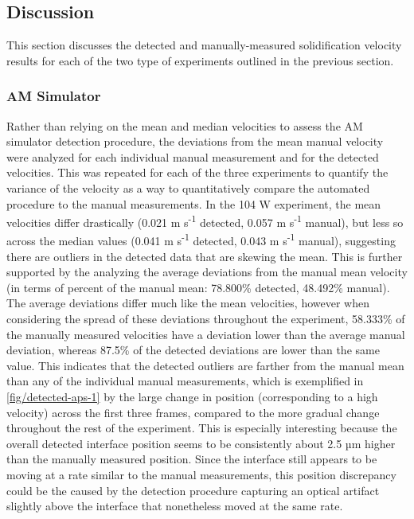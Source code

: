 \subsection{Discussion}
This section discusses the detected and manually-measured
solidification velocity results for each
of the two type of experiments outlined in the previous section.

\subsubsection{AM Simulator}
Rather than relying on the mean and median velocities to
assess the AM simulator detection procedure, the deviations from the mean
manual velocity were analyzed for each individual manual measurement
and for the detected velocities. This was repeated for each of the three
experiments to quantify the variance of the velocity as a way to
quantitatively compare the automated procedure to the manual measurements.
In the 104 W experiment, the mean velocities differ
drastically (0.021 m s\textsuperscript{-1} detected,
0.057 m s\textsuperscript{-1} manual), but less so
across the median values (0.041 m s\textsuperscript{-1} detected,
0.043 m s\textsuperscript{-1} manual),
suggesting there are outliers in the detected data that are skewing
the mean. This is further supported by the analyzing the average
deviations from the manual mean velocity (in terms of percent of the
manual mean: 78.800\% detected, 48.492\% manual). The average
deviations differ much like the mean velocities, however when considering
the spread of these deviations throughout the experiment, 58.333\% of
the manually measured velocities have a deviation lower than the average
manual deviation, whereas 87.5\% of the detected deviations are lower
than the same value. This indicates that the detected outliers are farther
from the manual mean than any of the individual manual measurements,
which is exemplified in \ref{fig/detected-aps-1} by the large
change in position (corresponding to a high velocity) across the first
three frames, compared to the more gradual change throughout the rest of the
experiment. This is especially interesting because the overall detected
interface position seems to be consistently about 2.5 µm higher than the
manually measured position. Since the interface still appears to be moving
at a rate similar to the manual measurements, this position discrepancy
could be the caused by the detection procedure capturing an optical artifact
slightly above the interface that nonetheless moved at the same rate.

